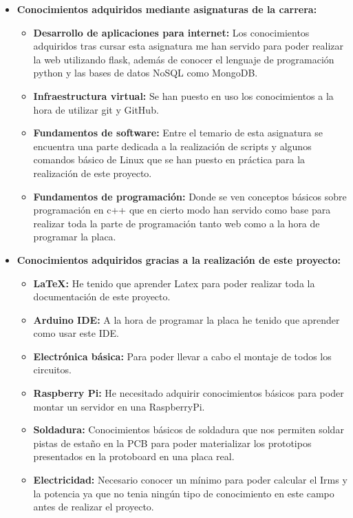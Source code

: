 \begin{itemize}
	\item\textbf{Conocimientos adquiridos mediante asignaturas de la carrera:}
	\begin{itemize}
		\item\textbf{Desarrollo de aplicaciones para internet:} Los conocimientos adquiridos tras cursar esta asignatura me han servido para poder realizar la web utilizando flask, además de conocer el lenguaje de programación python y las bases de datos NoSQL como MongoDB.
		\item\textbf{Infraestructura virtual:} Se han puesto en uso los conocimientos a la hora de utilizar git y GitHub.
		\item\textbf{Fundamentos de software:} Entre el temario de esta asignatura se encuentra una parte dedicada a la realización de scripts y algunos comandos básico de Linux que se han puesto en práctica para la realización de este proyecto.
		\item\textbf{Fundamentos de programación:} Donde se ven conceptos básicos sobre programación en c++ que en cierto modo han servido como base para realizar toda la parte de programación tanto web como a la hora de programar la placa.
	\end{itemize}
	\item\textbf{Conocimientos adquiridos gracias a la realización de este proyecto:}
		\begin{itemize}
		\item\textbf{\LaTeX:} He tenido que aprender Latex para poder realizar toda la documentación de este proyecto.
		\item\textbf{Arduino IDE:} A la hora de programar la placa he tenido que aprender como usar este IDE.
		\item\textbf{Electrónica básica:} Para poder llevar a cabo el montaje de todos los circuitos.
		\item\textbf{Raspberry Pi:} He necesitado adquirir conocimientos básicos para poder montar un servidor en una RaspberryPi.
		\item\textbf{Soldadura:} Conocimientos básicos de soldadura que nos permiten soldar pistas de estaño en la PCB para poder materializar los prototipos presentados en la protoboard en una placa real. 
		\item\textbf{Electricidad:} Necesario conocer un mínimo para poder calcular el Irms y la potencia ya que no tenia ningún tipo de conocimiento en este campo antes de realizar el proyecto.
	\end{itemize}
\end{itemize}



